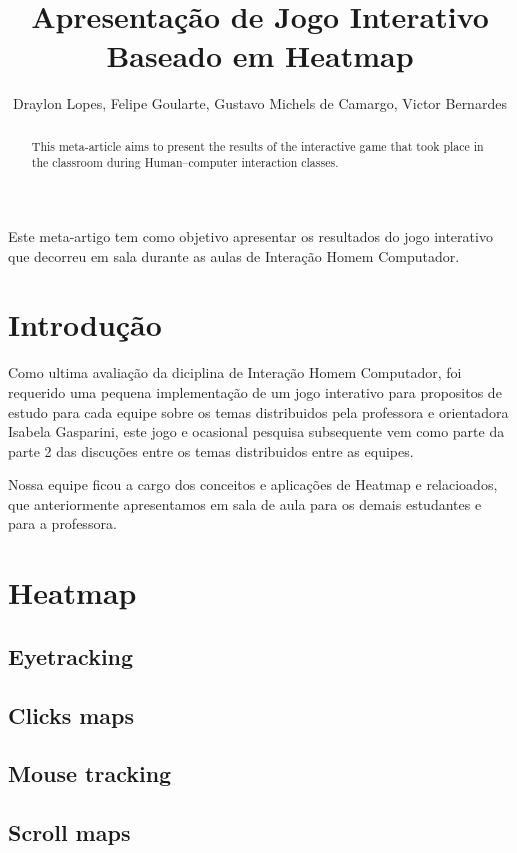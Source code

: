 \documentclass[12pt]{article}
\title{Apresentação de Jogo Interativo\\Baseado em Heatmap}
\author{Draylon Lopes\inst{1}, Felipe Goularte\inst{2}, Gustavo Michels de Camargo\inst{3}, Victor Bernardes\inst{4} }
\begin{document}
 

\maketitle

\begin{abstract}
  This meta-article aims to present the results of the interactive game that took place in the classroom during Human–computer interaction classes.
\end{abstract}
     
\begin{resumo} 
  Este meta-artigo tem como objetivo apresentar os resultados do jogo interativo que decorreu em sala durante as aulas de Interação Homem Computador.
\end{resumo}

\section{Introdução}

Como ultima avaliação da diciplina de Interação Homem Computador, foi requerido uma pequena implementação de um jogo interativo para propositos de estudo para cada equipe sobre os temas distribuidos pela professora e orientadora Isabela Gasparini, este jogo e ocasional pesquisa subsequente vem como parte da parte 2 das discuções entre os temas distribuidos entre as equipes.

Nossa equipe ficou a cargo dos conceitos e aplicações de Heatmap e relacioados, que anteriormente apresentamos em sala de aula para os demais estudantes e para a professora.

\section{Heatmap}

\subsection{Eyetracking}
\subsection{Clicks maps}
\subsection{Mouse tracking}
\subsection{Scroll maps}
\end{document}
